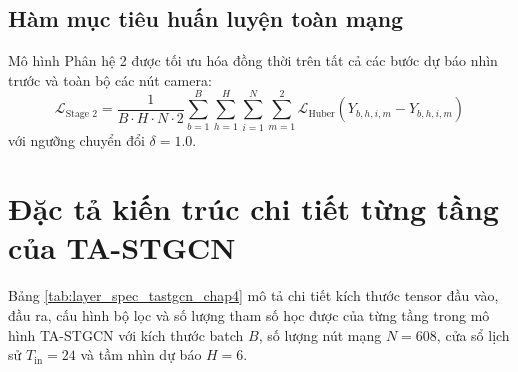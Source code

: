 \subsection{Hàm mục tiêu huấn luyện toàn mạng}
Mô hình Phân hệ 2 được tối ưu hóa đồng thời trên tất cả các bước dự báo nhìn trước và toàn bộ các nút camera:
\begin{equation}
    \mathcal{L}_{\text{Stage 2}} = \frac{1}{B \cdot H \cdot N \cdot 2} \sum_{b=1}^{B} \sum_{h=1}^{H} \sum_{i=1}^{N} \sum_{m=1}^{2} \mathcal{L}_{\mathrm{Huber}}\left( Y_{b,h,i,m} - \hat{Y}_{b,h,i,m} \right)
\end{equation}
với ngưỡng chuyển đổi $\delta = 1.0$.

\section{Đặc tả kiến trúc chi tiết từng tầng của TA-STGCN}
\label{sec:dac_ta_kien_truc}

Bảng \ref{tab:layer_spec_tastgcn_chap4} mô tả chi tiết kích thước tensor đầu vào, đầu ra, cấu hình bộ lọc và số lượng tham số học được của từng tầng trong mô hình TA-STGCN với kích thước batch $B$, số lượng nút mạng $N=608$, cửa sổ lịch sử $T_{\text{in}}=24$ và tầm nhìn dự báo $H=6$.

